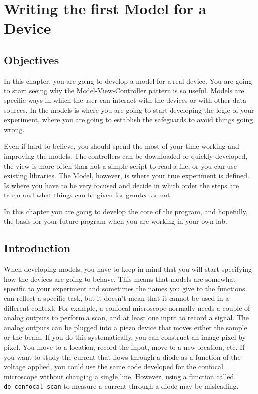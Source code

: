 \chapter{Writing the first Model for a Device}\label{writing-the-first-model-for-adevice}

\section{Objectives}
In this chapter, you are going to develop a model for a real device. You
are going to start seeing why the Model-View-Controller pattern is so
useful. Models are specific ways in which the user can interact with the
devices or with other data sources. In the models is where you are going
to start developing the logic of your experiment, where you are going to
establish the safeguards to avoid things going wrong.

Even if hard to believe, you should spend the most of your time working
and improving the models. The controllers can be downloaded or quickly
developed, the view is more often than not a simple script to read a
file, or you can use existing libraries. The Model, however, is where
your true experiment is defined. Is where you have to be very focused
and decide in which order the steps are taken and what things can be
given for granted or not.

In this chapter you are going to develop the core of the program, and
hopefully, the basis for your future program when you are working in your
own lab.

\section{Introduction}
When developing models, you have to keep in mind that you will start
specifying how the devices are going to behave. This means that models
are somewhat specific to your experiment and sometimes the names you
give to the functions can reflect a specific task, but it doesn't mean
that it cannot be used in a different context. For example, a confocal
microscope normally needs a couple of analog outputs to perform a scan,
and at least one input to record a signal. The analog outputs can be
plugged into a piezo device that moves either the sample or the beam. If
you do this systematically, you can construct an image pixel by pixel.
You move to a location, record the input, move to a new location, etc.
If you want to study the current that flows through a diode as a function of the voltage applied, you could use the same code developed
for the confocal microscope without changing a single line. However,
using a function called \texttt{do_confocal_scan} to measure a current
through a diode may be misleading.

